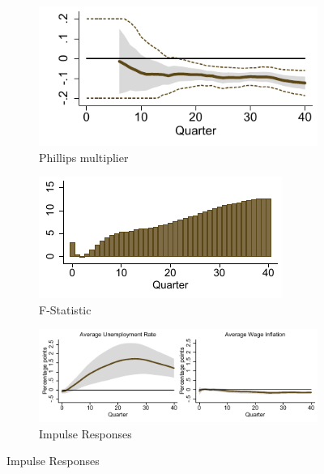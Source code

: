 \documentclass[12pt]{article}
\begin{document}
\begin{appendices}
\begin{singlespace}
\begin{figure}[h!]
    \centering
	\caption{Quarterly Data Phillips multiplier and IRFs}
	\label{F:MultiplierQ}
	\begin{subfigure}[b]{0.45\textwidth}
		\caption{Phillips multiplier}
		\label{F:MultiplierQ_M}
		\includegraphics[width=\textwidth]{../Output/Figures/Figure_A9a.pdf}	
	\end{subfigure}
	\begin{subfigure}[b]{0.45\textwidth}
		\caption{F-Statistic}
		\label{F:MultiplierQ_F}
		\includegraphics[width=\textwidth]{../Output/Figures/Figure_A9b.pdf}
	\end{subfigure}
	\begin{subfigure}[b]{0.9\textwidth}
		\caption{Impulse Responses}
		\label{F:DynamicsQ}
		\includegraphics[width=\textwidth]{../Output/Figures/Figure_A9c.pdf}

\end{subfigure}
\end{figure}
\end{singlespace}
\end{appendices}
\end{document}
